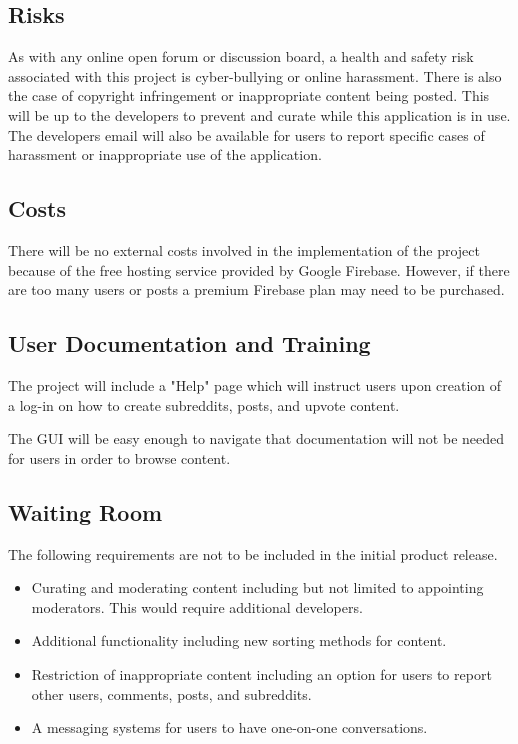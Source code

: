 \documentclass[12pt,fleqn]{article}
\begin{document}
\subsection {Risks}
As with any online open forum or discussion board, a health and safety risk associated with this project is cyber-bullying or online harassment. There is also the case of copyright infringement or inappropriate content being posted. This will be up to the developers to prevent and curate while this application is in use.  The developers email will also be available for users to report specific cases of harassment or inappropriate use of the application.

\subsection {Costs}
There will be no external costs involved in the implementation of the project because of the free hosting service provided by Google Firebase. However, if there are too many users or posts a premium Firebase plan may need to be purchased. 

\subsection {User Documentation and Training}
The project will include a "Help" page which will instruct users upon creation of a log-in on how to create subreddits, posts, and upvote content.

The GUI will be easy enough to navigate that documentation will not be needed for users in order to browse content.
\subsection {Waiting Room}
The following requirements are not to be included in the initial product release.
\begin{itemize}
\item Curating and moderating content including but not limited to appointing moderators.  This would require additional developers.
\item Additional functionality including new sorting methods for content.
\item Restriction of inappropriate content including an option for users to report other users, comments, posts, and subreddits.
\item A messaging systems for users to have one-on-one conversations.
\end{itemize}
\end{document}
